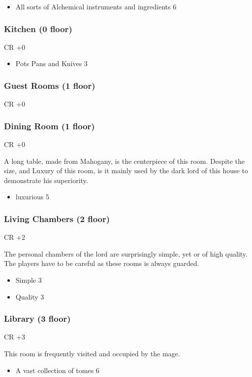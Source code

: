 \documentclass[11pt]{article}
\begin{document}
{\begin{itemize}
\item All sorts of Alchemical instruments and ingredients 6
\end{itemize}
\subsubsection{Kitchen (0 floor)}
\label{sec:orga318111}
CR +0

\begin{itemize}
\item Pots Pans and Knives 3
\end{itemize}
\subsubsection{Guest Rooms (1 floor)}
\label{sec:orgffbc6ca}
CR +0
\subsubsection{Dining Room (1 floor)}
\label{sec:orgd8dff27}
CR +0

A long table, made from Mahogany, is the centerpiece of this room. Despite the size, and Luxury of this room, is it mainly used by the dark lord of this house to demonstrate his superiority.

\begin{itemize}
\item luxurious 5
\end{itemize}
\subsubsection{Living Chambers (2 floor)}
\label{sec:org1c48fb0}
CR +2

The personal chambers of the lord are surprisingly simple, yet or of high quality. The players have to be careful as these rooms is always guarded. 

\begin{itemize}
\item Simple 3
\item Quality 3
\end{itemize}
\subsubsection{Library (3 floor)}
\label{sec:orgd04c9d3}
CR +3

This room is frequently visited and occupied by the mage.

\begin{itemize}
\item A vast collection of tomes 6
\end{itemize}
}
\end{document}

